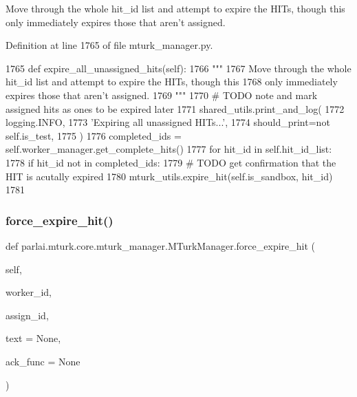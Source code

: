 \begin{DoxyVerb}Move through the whole hit_id list and attempt to expire the HITs, though this
only immediately expires those that aren't assigned.
\end{DoxyVerb}
 

Definition at line 1765 of file mturk\+\_\+manager.\+py.


\begin{DoxyCode}
1765     \textcolor{keyword}{def }expire\_all\_unassigned\_hits(self):
1766         \textcolor{stringliteral}{"""}
1767 \textcolor{stringliteral}{        Move through the whole hit\_id list and attempt to expire the HITs, though this}
1768 \textcolor{stringliteral}{        only immediately expires those that aren't assigned.}
1769 \textcolor{stringliteral}{        """}
1770         \textcolor{comment}{# TODO note and mark assigned hits as ones to be expired later}
1771         shared\_utils.print\_and\_log(
1772             logging.INFO,
1773             \textcolor{stringliteral}{'Expiring all unassigned HITs...'},
1774             should\_print=\textcolor{keywordflow}{not} self.is\_test,
1775         )
1776         completed\_ids = self.worker\_manager.get\_complete\_hits()
1777         \textcolor{keywordflow}{for} hit\_id \textcolor{keywordflow}{in} self.hit\_id\_list:
1778             \textcolor{keywordflow}{if} hit\_id \textcolor{keywordflow}{not} \textcolor{keywordflow}{in} completed\_ids:
1779                 \textcolor{comment}{# TODO get confirmation that the HIT is acutally expired}
1780                 mturk\_utils.expire\_hit(self.is\_sandbox, hit\_id)
1781 
\end{DoxyCode}
\mbox{\label{classparlai_1_1mturk_1_1core_1_1mturk__manager_1_1MTurkManager_aed4375d01be65944318d695adbac88af}} 
\subsubsection{\texorpdfstring{force\+\_\+expire\+\_\+hit()}{force\_expire\_hit()}}
{\footnotesize\ttfamily def parlai.\+mturk.\+core.\+mturk\+\_\+manager.\+M\+Turk\+Manager.\+force\+\_\+expire\+\_\+hit (\begin{DoxyParamCaption}\item[{}]{self,  }\item[{}]{worker\+\_\+id,  }\item[{}]{assign\+\_\+id,  }\item[{}]{text = {\ttfamily None},  }\item[{}]{ack\+\_\+func = {\ttfamily None} }\end{DoxyParamCaption})}

